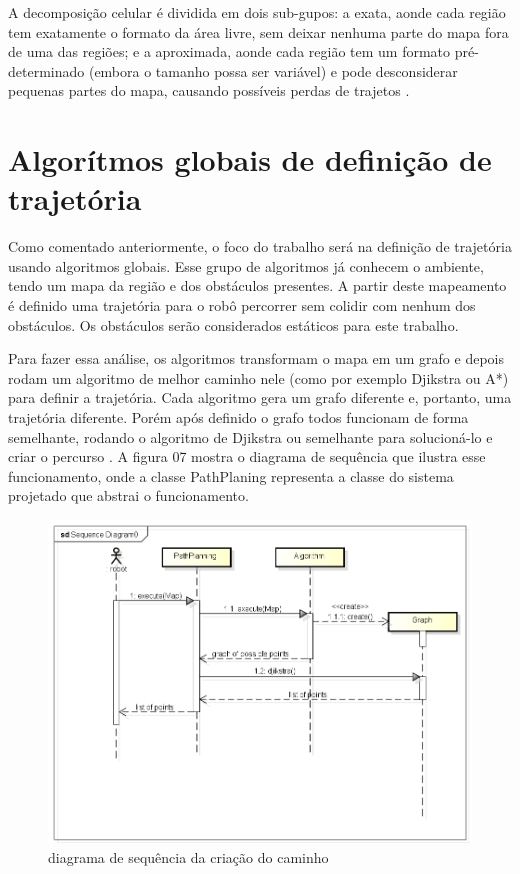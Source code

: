 A decomposição celular é dividida em dois sub-gupos: a exata, aonde cada região tem exatamente o formato da área livre, sem deixar nenhuma parte do mapa fora de uma das regiões; e a aproximada, aonde cada região tem um formato pré-determinado (embora o tamanho possa ser variável) e pode desconsiderar pequenas partes do mapa, causando possíveis perdas de trajetos \cite{Souza2008}.

\section{Algorítmos globais de definição de trajetória}

Como comentado anteriormente, o foco do trabalho será na definição de trajetória usando algoritmos globais. Esse grupo de algoritmos já conhecem o ambiente, tendo um mapa da região e dos obstáculos presentes. A partir deste mapeamento é definido uma trajetória para o robô percorrer sem colidir com nenhum dos obstáculos. Os obstáculos serão considerados estáticos para este trabalho.

Para fazer essa análise, os algoritmos transformam o mapa em um grafo e depois rodam um algoritmo de melhor caminho nele (como por exemplo Djikstra ou A*) para definir a trajetória. Cada algoritmo gera um grafo diferente e, portanto, uma trajetória diferente. Porém após definido o grafo todos funcionam de forma semelhante, rodando o algoritmo de Djikstra ou semelhante para solucioná-lo e criar o percurso \cite{Guzman2008}. A figura 07 mostra o diagrama de sequência que ilustra esse funcionamento, onde a classe PathPlaning representa a classe do sistema projetado que abstrai o funcionamento.

\begin{figure}[h]
	\centering
	\label{fig07}
		\includegraphics[keepaspectratio=true,scale=0.6]{figuras/5diagramaSequencia.png}
	\caption{diagrama de sequência da criação do caminho}
\end{figure}

